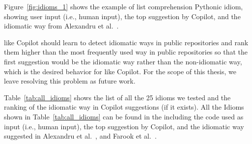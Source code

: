 Figure~\ref{fig:idioms_1} shows the example of list comprehension Pythonic idiom, showing user input (i.e., human input), the top suggestion by Copilot, and the idiomatic way from Alexandru et al.~\cite{Alexandru2018}.

\cct{} like Copilot should learn to detect idiomatic ways in public repositories and rank them higher than the most frequently used way in public repositories so that the first suggestion would be the idiomatic way rather than the non-idiomatic way, which is the desired behavior for \cct{} like Copilot. For the scope of this thesis, we leave resolving this problem as future work.


Table~\ref{tab:all_idioms} shows the list of all the 25 idioms we tested and the ranking of the idiomatic way in Copilot suggestions (if it exists).
All the Idioms shown in Table~\ref{tab:all_idioms} can be found in the \repl{} including the code used as input (i.e., human input), the top suggestion by Copilot, and the idiomatic way suggested in Alexandru et al.~\cite{Alexandru2018}, and Farook et al.~\cite{idioms}. 

